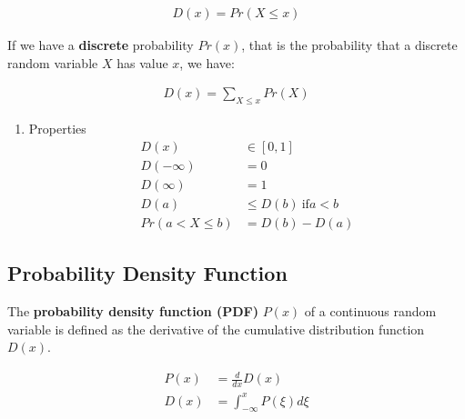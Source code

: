 \documentclass[11pt]{article}
\begin{document}
 \begin{align*}
     D\left( x \right) = Pr\left(X \leq x\right)
\end{align*}

If we have a \textbf{discrete} probability \(Pr\left( x \right)\), that is the probability that a discrete random variable \(X\) has value \(x\), we have:

\begin{align*}
    D\left( x \right) = \sum_{X \leq x} Pr\left( X \right)
\end{align*}

\begin{enumerate}
\item Properties
\label{sec:org1aa8c20}
\begin{align*}
    D\left( x \right) &\in \left[0,1\right] \\
    D\left( -\infty \right) &= 0 \\
    D\left( \infty \right) &= 1 \\
    D\left( a \right) &\leq D\left( b \right)\ \text{if} a < b \\
    Pr\left( a < X \leq b \right) &= D\left( b \right) - D\left( a \right)
\end{align*}
\end{enumerate}

\subsection{Probability Density Function}
\label{sec:orgd447cc6}
The \textbf{probability density function (PDF)} \(P\left( x \right)\) of a continuous random variable is defined as the derivative of the cumulative distribution function \(D\left( x \right)\).

\begin{align*}
    P\left( x \right) &= \frac{d}{dx}D\left( x \right) \\
    D\left( x \right) &= \int_{-\infty}^{x} P\left( \xi \right) d\xi
\end{align*}
\end{document}
